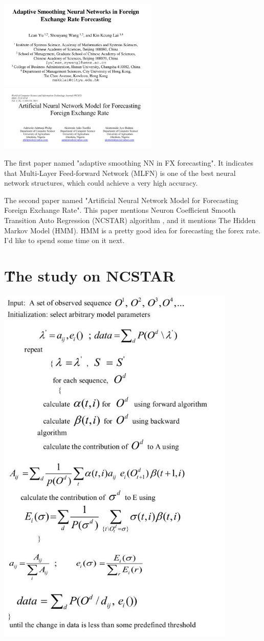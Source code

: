 \documentclass[12pt]{article}
\begin{document}
\includegraphics[width=3in]{003.jpg}
\includegraphics[width=3in]{002.jpg}

The first paper named "adaptive smoothing NN in FX forecasting". It indicates that Multi-Layer Feed-forward Network (MLFN)  is one of the best neural network structures, which could achieve a very high accuracy.

The second paper named "Artificial Neural Network Model for Forecasting Foreign Exchange Rate". This paper mentions Neuron Coefficient Smooth Transition Auto Regression (NCSTAR) algorithm , and it mentions The Hidden Markov Model (HMM). HMM is a pretty good idea for forecasting the forex rate. I'd like to spend some time on it  next.

\section{\H The study on NCSTAR}
\includegraphics[width=4.5in]{001.jpg}











\end{document}
